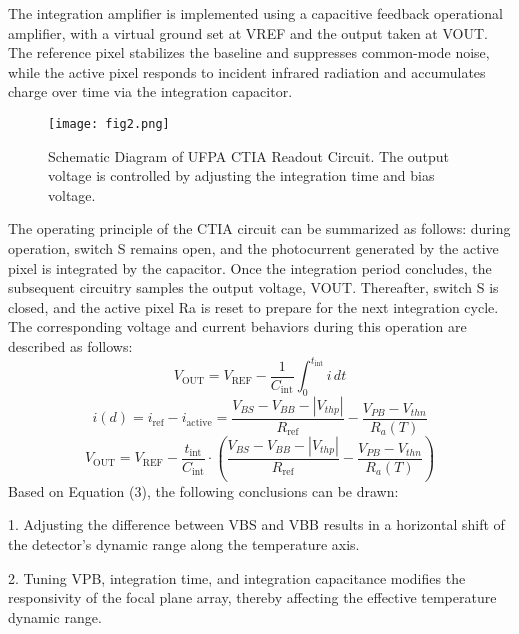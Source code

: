 \documentclass[a4paper,fleqn]{cas-dc}
\begin{document}
The integration amplifier is implemented using a capacitive feedback operational amplifier, with a virtual ground set at VREF and the output taken at VOUT. The reference pixel stabilizes the baseline and suppresses common-mode noise, while the active pixel responds to incident infrared radiation and accumulates charge over time via the integration capacitor.

\begin{figure}[ht]
    \centering
    \texttt{[image: fig2.png]}
    \caption{Schematic Diagram of UFPA CTIA Readout Circuit. The output voltage is controlled by adjusting the integration time and bias voltage.}
    \label{fig:fig2}
\end{figure}

The operating principle of the CTIA circuit can be summarized as follows: during operation, switch S remains open, and the photocurrent generated by the active pixel is integrated by the capacitor. Once the integration period concludes, the subsequent circuitry samples the output voltage, VOUT. Thereafter, switch S is closed, and the active pixel Ra is reset to prepare for the next integration cycle\citep{nagata_cryogenic_2004,zhuo_low-noise_2021}. The corresponding voltage and current behaviors during this operation are described as follows:
\begin{equation}
V_{\text{OUT}} = V_{\text{REF}} - \frac{1}{C_{\text{int}}} \int_{0}^{t_{\text{int}}} i\, dt
\end{equation}
\begin{equation}
i(d) = i_{\text{ref}} - i_{\text{active}} 
= \frac{V_{BS} - V_{BB} - \left| V_{thp} \right|}{R_{\text{ref}}} 
- \frac{V_{PB} - V_{thn}}{R_a(T)}
\end{equation}
\begin{equation}
V_{\text{OUT}} = V_{\text{REF}} 
- \frac{t_{\text{int}}}{C_{\text{int}}} \cdot 
\left( \frac{V_{BS} - V_{BB} - \left| V_{thp} \right|}{R_{\text{ref}}} 
- \frac{V_{PB} - V_{thn}}{R_a(T)} \right)
\end{equation}
Based on Equation (3), the following conclusions can be drawn:

1. Adjusting the difference between VBS and VBB results in a horizontal shift of the detector’s dynamic range along the temperature axis.

2. Tuning VPB, integration time, and integration capacitance modifies the responsivity of the focal plane array, thereby affecting the effective temperature dynamic range.
\end{document}
